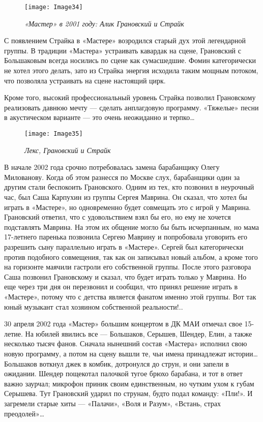 \documentclass[16pt,a5paper,oneside]{book}
\begin{document}
\begin{figure}
    \centering
    \texttt{[image: Image34]}
    \caption{\textit{«Мастер» в 2001 году: Алик Грановский и Страйк}}
\end{figure}

С появлением Страйка в «Мастере» возродился старый дух этой легендарной группы. В традиции «Мастера» устраивать кавардак
на сцене, Грановский с Большаковым всегда носились по сцене как сумасшедшие. Фомин категорически не хотел этого делать,
зато из Страйка энергия исходила таким мощным потоком, что позволяла устраивать на сцене настоящий цирк.

Кроме того, высокий профессиональный уровень Страйка позволил Грановскому реализовать давнюю мечту — сделать анплагдовую
программу. «Тяжелые» песни в акустическом варианте — это очень неожиданно и терпко\ldots

\begin{figure}
    \centering
    \texttt{[image: Image35]}
    \caption{\textit{Лекс, Грановский и Страйк}}
\end{figure}

В начале 2002 года срочно потребовалась замена барабанщику Олегу Милованову. Когда об этом разнесся по Москве слух,
барабанщики один за другим стали беспокоить Грановского. Одним из тех, кто позвонил в неурочный час, был Саша Карпухин
из группы Сергея Маврина. Он сказал, что хотел бы играть в «Мастере», но одновременно будет совмещать это с игрой у
Маврина. Грановский ответил, что с удовольствием взял бы его, но ему не хочется подставлять Маврина. На этом их общение
могло бы быть исчерпанным, но мама 17-летнего паренька позвонила Сергею Маврину и попробовала уговорить его разрешить
сыну параллельно играть в «Мастере». Сергей был категорически против подобного совмещения, так как он записывал новый
альбом, а кроме того на горизонте маячили гастроли его собственной группы. После этого разговора Саша позвонил
Грановскому и сказал, что будет играть только у Маврина. Но еще через три дня он перезвонил и сообщил, что принял
решение играть в «Мастере», потому что с детства является фанатом именно этой группы. Вот так юный музыкант стал
хозяином собственной реальности!..

30 апреля 2002 года «Мастер» большим концертом в ДК МАИ отмечал свое 15-летие. На юбилей явились все — Большаков,
Серышев, Шендер, Елин, а также несколько тысяч фанов. Сначала нынешний состав «Мастера» исполнил свою новую программу, а
потом на сцену вышли те, чьи имена принадлежат истории\ldots Большаков воткнул джек в комбик, дотронулся до струн, и они
запели в ожидании. Шендер пощекотал палочкой тугое брюхо барабана, и тот в ответ важно заурчал; микрофон приник своим
единственным, но чутким ухом к губам Серышева. Тут Грановский ударил по струнам, будто подал команду: «Пли!». И
загремели старые хиты — «Палачи», «Воля и Разум», «Встань, страх преодолей»\ldots
\end{document}
